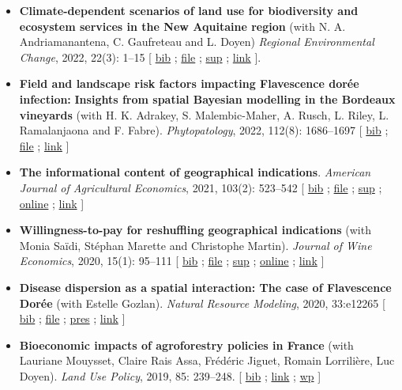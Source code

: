 \documentclass[11pt, a4paper]{./style}
\begin{document}
\begin{itemize}
\item \textbf{Climate-dependent scenarios of land use for biodiversity and
ecosystem services in the New Aquitaine region} (with
N. A. Andriamanantena, C. Gaufreteau and L. Doyen) \emph{Regional
Environmental Change}, 2022, 22(3): 1--15 [ \href{bib/MDFD.bib}{bib} ; \href{doc/CDSA-FILE.pdf}{file} ; \href{doc/CDSA-SUP.pdf}{sup} ;
\href{https://link.springer.com/article/10.1007/s10113-022-01964-6}{link} ].
\item \textbf{Field and landscape risk factors impacting Flavescence dorée
infection:} \textbf{Insights from spatial Bayesian modelling in the
Bordeaux vineyards} (with H. K. Adrakey, S. Malembic-Maher,
A. Rusch, L. Riley, L. Ramalanjaona and
F. Fabre). \emph{Phytopatology}, 2022, 112(8): 1686--1697 [ \href{bib/MDFD.bib}{bib} ; \href{doc/MDFD-FILE.pdf}{file}
; \href{https://apsjournals.apsnet.org/doi/10.1094/PHYTO-10-21-0449-R}{link} ]
\item \textbf{The informational content of geographical
indications}. \emph{American Journal of Agricultural Economics}, 2021,
103(2): 523--542 [ \href{bib/GEOIND.bib}{bib} ; \href{doc/GEOIND-FILE.pdf}{file} ; \href{doc/GEOIND-SUP.pdf}{sup} ; \href{https://github.com/jsay/geoInd/}{online} ; \href{https://onlinelibrary.wiley.com/doi/full/10.1111/ajae.12100}{link} ]
\item \textbf{Willingness-to-pay for reshuffling geographical indications}
(with Monia Saïdi, Stéphan Marette and Christophe
Martin). \emph{Journal of Wine Economics}, 2020, 15(1): 95--111 [ \href{bib/RFGI.bib}{bib}
; \href{doc/RFGI-FILE.pdf}{file} ; \href{doc/RFGI-SUP.pdf}{sup} ; \href{https://github.com/jsay/reshufGI/}{online} ; \href{https://www.cambridge.org/core/journals/journal-of-wine-economics/article/abs/willingnesstopay-for-reshuffling-geographical-indications/FD4DB1BCA54C1E204773BF861965BEBD}{link} ]
\item \textbf{Disease dispersion as a spatial interaction: The case of
Flavescence Dorée} (with Estelle Gozlan). \emph{Natural Resource
Modeling}, 2020, 33:e12265 [ \href{bib/SPFD.bib}{bib} ; \href{doc/SPFD-FILE.pdf}{file} ; \href{doc/SPFD-PRES.pdf}{pres} ; \href{https://onlinelibrary.wiley.com/doi/full/10.1111/nrm.12265}{link} ]
\item \textbf{Bioeconomic impacts of agroforestry policies in France} (with
Lauriane Mouysset, Claire Rais Assa, Frédéric Jiguet, Romain
Lorrilière, Luc Doyen). \emph{Land Use Policy}, 2019, 85: 239--248.  [
\href{bib/BIOFOR.bib}{bib} ; \href{https://www.sciencedirect.com/science/article/abs/pii/S0264837718308160}{link} ;  \href{http://cahiersdugretha.u-bordeaux4.fr/2017/2017-05.pdf}{wp} ]

\end{itemize}
\end{document}
